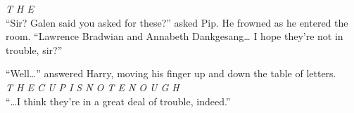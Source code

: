 \emph{T H E}\\

``Sir? Galen said you asked for these?'' asked Pip. He frowned as he
entered the room. ``Lawrence Bradwian and Annabeth Dankgesang\ldots{} I
hope they're not in trouble, sir?''

``Well\ldots{}'' answered Harry, moving his finger up and down the table
of letters.\\

\emph{T H E C U P I S N O T E N O U G H}\\

``\ldots I think they're in a great deal of trouble, indeed.''
